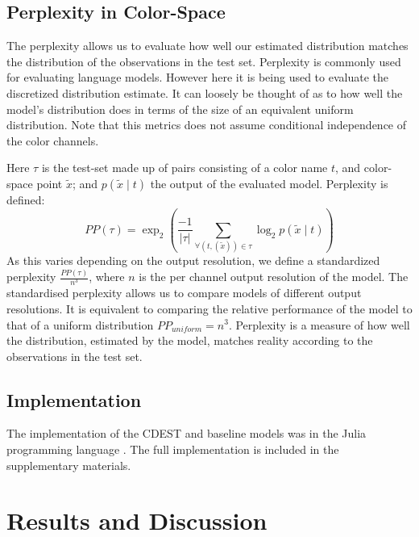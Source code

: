 \documentclass[11pt,a4paper]{article}
\newcommand{\parencite}{\citep}
\begin{document}
\subsection{Perplexity in Color-Space}
The perplexity allows us to evaluate how well our estimated distribution matches the distribution of the observations in the test set.
Perplexity is commonly used for evaluating language models. However here it is being used to evaluate the discretized distribution estimate.
It can loosely be thought of as to how well the model's distribution does in terms of the size of an equivalent uniform distribution.
Note that this metrics does not assume conditional independence of the color channels.

Here $\tau$ is the test-set made up of pairs consisting of a color name $t$, and color-space point $\tilde{x}$;
and  $p(\tilde{x}\mid t)$  the output of the evaluated model.
Perplexity is defined:
\[
 PP(\tau) = \exp_2{\left(
 	\frac{-1}{|\tau|} 
 	\sum_{
	 		\forall(t,(\tilde{x})) \in \tau}
 	 \log_2 p(\tilde{x}\mid t)\right)}
\]
As this varies depending on the output resolution,
we define a standardized perplexity $\frac{PP(\tau)}{n^3}$, where $n$ is the per channel output resolution of the model.
The standardised perplexity allows us to compare models of different output resolutions.
It is equivalent to comparing the relative performance of the model to that of a uniform distribution $PP_{uniform}=n^3$.
Perplexity is a measure of how well the distribution, estimated by the model, matches reality according to the observations in the test set.

\subsection{Implementation}
The implementation of the CDEST and baseline models was in the Julia programming language \parencite{Julia}.
The full implementation is included in the supplementary materials.


\section{Results and Discussion}\label{sec:results-and-discussion}
\end{document}
